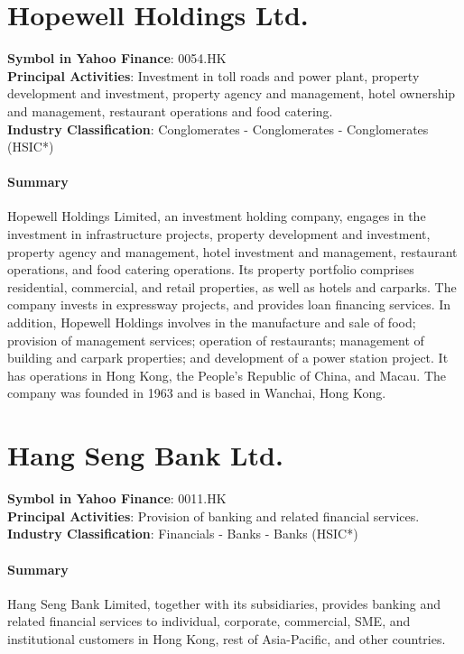 \section{Hopewell Holdings Ltd.}
\textbf{Symbol in Yahoo Finance}: 0054.HK\\
\textbf{Principal Activities}: Investment in toll roads and power plant, property development and investment, property agency and management, hotel ownership and management, restaurant operations and food catering.\\
\textbf{Industry Classification}: Conglomerates - Conglomerates - Conglomerates (HSIC*)
\paragraph{Summary}
Hopewell Holdings Limited, an investment holding company, engages in the investment in infrastructure projects, property development and investment, property agency and management, hotel investment and management, restaurant operations, and food catering operations. Its property portfolio comprises residential, commercial, and retail properties, as well as hotels and carparks. The company invests in expressway projects, and provides loan financing services. In addition, Hopewell Holdings involves in the manufacture and sale of food; provision of management services; operation of restaurants; management of building and carpark properties; and development of a power station project. It has operations in Hong Kong, the People's Republic of China, and Macau. The company was founded in 1963 and is based in Wanchai, Hong Kong.


\section{Hang Seng Bank Ltd.}
\textbf{Symbol in Yahoo Finance}: 0011.HK\\
\textbf{Principal Activities}: Provision of banking and related financial services.\\
\textbf{Industry Classification}: Financials - Banks - Banks (HSIC*)
\paragraph{Summary}
Hang Seng Bank Limited, together with its subsidiaries, provides banking and related financial services to individual, corporate, commercial, SME, and institutional customers in Hong Kong, rest of Asia-Pacific, and other countries.


